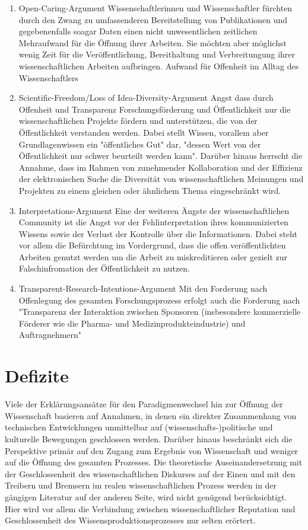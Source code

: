 \begin{enumerate}
\item Open-Caring-Argument
Wissenschaftlerinnen und Wissenschaftler fürchten durch den Zwang zu umfassenderen Bereitstellung von Publikationen und gegebenenfalls soagar Daten einen nicht unwesentlichen zeitlichen Mehraufwand für die Öffnung ihrer Arbeiten. Sie möchten aber möglichst wenig Zeit für die Veröffentlichung, Bereithaltung und Verbreitungung ihrer wissenschaftlichen Arbeiten aufbringen.
	Aufwand für Offenheit im Alltag des Wissenschaftlers
\item Scientific-Freedom/Loss of Idea-Diversity-Argument
Angst dass durch Offenheit und Transparenz Forschungsförderung und Öffentlichkeit nur die wissenschaftlichen Projekte fördern und unterstützen, die von der Öffentlichkeit verstanden werden. Dabei stellt Wissen, vorallem aber Grundlagenwissen ein "öffentliches Gut" dar, "dessen Wert von der Öffentlichkeit nur schwer beurteilt werden kann"\cite{osterloh2008anreize}. Darüber hinaus herrscht die Annahme, dass im Rahmen von zunehmender Kollaboration und der Effizienz der elektronischen Suche die Diversität von wissenschaftlichen Meinungen und Projekten zu einem gleichen oder ähnlichem Thema eingeschränkt wird\cite{Evans_2008}.
\item Interpretations-Argument
Eine der weiteren Ängste der wissenschaftlichen Community ist die Angst vor der Fehlinterpretation ihres kommunizierten Wissens sowie der Verlust der Kontrolle über die Informationen\cite{gibbons_1994}. Dabei steht vor allem die Befürchtung im Vordergrund, dass die offen veröffentlichten Arbeiten genutzt werden um die Arbeit zu miskreditieren oder gezielt zur Falschinfromation der Öffentlichkeit zu nutzen.
\item Transparent-Research-Intentions-Argument
Mit den Forderung nach Offenlegung des gesamten Forschungsprozess erfolgt auch die Forderung nach "Transparenz der Interaktion zwischen Sponsoren (insbesondere kommerzielle Förderer wie die Pharma- und Medizinprodukteindustrie) und Auftragnehmern" \cite{Stengel_2013} 
\end{enumerate}


\section{Defizite}
Viele der Erklärungsansätze für den Paradigmenwechsel hin zur Öffnung der Wissenschaft basieren auf Annahmen, in denen ein direkter Zusammenhang von technischen Entwicklungen unmittelbar auf (wissenschafts-)politische und kulturelle Bewegungen geschlossen werden. Darüber hinaus beschränkt sich die Perspektive primär auf den Zugang zum Ergebnis von Wissenschaft und weniger auf die Öffnung des gesamten Prozesses. Die theoretische Auseinandersetzung mit der Geschlossenheit des wissenschaftlichen Diskurses  auf der Einen und mit den Treibern und Bremsern im realen wissenschaftlichen Prozess werden in der gängigen Literatur auf der anderen Seite, wird nicht genügend berücksichtigt. Hier wird vor allem die Verbindung zwischen wissenschaftlicher Reputation und Geschlossenheit des Wissensproduktionsprozesses nur selten erörtert.
